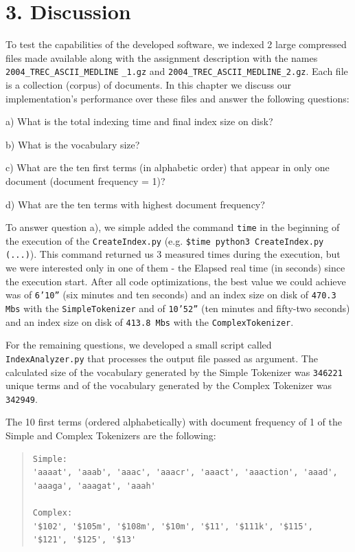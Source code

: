 \documentclass[12pt]{article}
\begin{document}
\newpage
\section*{3. Discussion}

To test the capabilities of the developed software, we indexed 2 large 
compressed files made available along with the assignment description
with the names \texttt{2004\_TREC\_ASCII\_MEDLINE} \texttt{\_1.gz} and 
\texttt{2004\_TREC\_ASCII\_MEDLINE\_2.gz}.
Each file is a collection (corpus) of documents.
In this chapter we discuss our implementation's performance over these 
files and answer the following questions:

a) What is the total indexing time and final index size on disk?

b) What is the vocabulary size?

c) What are the ten first terms (in alphabetic order) that appear in 
only one document (document frequency = 1)?

d) What are the ten terms with highest document frequency?

To answer question a), we simple added the command \texttt{time} in the
beginning of the execution of the \texttt{CreateIndex.py} 
(e.g. \texttt{\$time python3 CreateIndex.py (...)}).
This command returned us 3 measured times during the execution, but we 
were interested only in one of them - the Elapsed real time (in seconds)
since the execution start.
After all code optimizations, the best value we could achieve was of 
\texttt{6'10''} (six minutes and ten seconds) and an index size on 
disk of \texttt{470.3 Mbs} with the \texttt{SimpleTokenizer} and of 
\texttt{10'52''} (ten minutes and fifty-two seconds) and an index 
size on disk of \texttt{413.8 Mbs} with the \texttt{ComplexTokenizer}.

For the remaining questions, we developed a small script called
\texttt{IndexAnalyzer.py} that processes the output file passed as argument.
The calculated size of the vocabulary generated by the Simple Tokenizer
was \texttt{346221} unique terms and of the vocabulary generated by the 
Complex Tokenizer was \texttt{342949}.

The 10 first terms (ordered alphabetically) with document frequency of 1 
of the Simple and Complex Tokenizers are the following:

\begingroup
\addtolength\leftmargini{-0.4in}
\addtolength\baselineskip{-0.05in}
\begin{quote}
\begin{verbatim}
Simple:
'aaaat', 'aaab', 'aaac', 'aaacr', 'aaact', 'aaaction', 'aaad', 
'aaaga', 'aaagat', 'aaah'

Complex:
'$102', '$105m', '$108m', '$10m', '$11', '$111k', '$115',
'$121', '$125', '$13'
\end{verbatim}
\end{quote}
\endgroup
\end{document}
